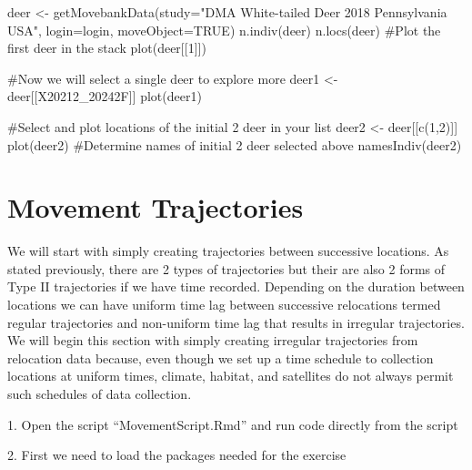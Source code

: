 \documentclass[
  letterpaper,
]{book}
\newenvironment{Shaded}{\begin{snugshade}}{\end{snugshade}}
\newcommand{\AttributeTok}[1]{\textcolor[rgb]{0.40,0.45,0.13}{#1}}
\newcommand{\CommentTok}[1]{\textcolor[rgb]{0.37,0.37,0.37}{#1}}
\newcommand{\ConstantTok}[1]{\textcolor[rgb]{0.56,0.35,0.01}{#1}}
\newcommand{\DecValTok}[1]{\textcolor[rgb]{0.68,0.00,0.00}{#1}}
\newcommand{\FunctionTok}[1]{\textcolor[rgb]{0.28,0.35,0.67}{#1}}
\newcommand{\NormalTok}[1]{\textcolor[rgb]{0.00,0.23,0.31}{#1}}
\newcommand{\OtherTok}[1]{\textcolor[rgb]{0.00,0.23,0.31}{#1}}
\newcommand{\StringTok}[1]{\textcolor[rgb]{0.13,0.47,0.30}{#1}}
\begin{document}
\begin{Shaded}
\begin{Highlighting}[]
\NormalTok{deer }\OtherTok{\textless{}{-}} \FunctionTok{getMovebankData}\NormalTok{(}\AttributeTok{study=}\StringTok{"DMA White{-}tailed Deer 2018 Pennsylvania USA"}\NormalTok{,}
                        \AttributeTok{login=}\NormalTok{login, }\AttributeTok{moveObject=}\ConstantTok{TRUE}\NormalTok{)}
\FunctionTok{n.indiv}\NormalTok{(deer)}
\FunctionTok{n.locs}\NormalTok{(deer)}
\CommentTok{\#Plot the first deer in the stack}
\FunctionTok{plot}\NormalTok{(deer[[}\DecValTok{1}\NormalTok{]])}

\CommentTok{\#Now we will select a single deer to explore more}
\NormalTok{deer1 }\OtherTok{\textless{}{-}}\NormalTok{ deer[[}\StringTok{\textquotesingle{}X20212\_20242F\textquotesingle{}}\NormalTok{]]}
\FunctionTok{plot}\NormalTok{(deer1)}

\CommentTok{\#Select and plot locations of the initial 2 deer in your list}
\NormalTok{deer2 }\OtherTok{\textless{}{-}}\NormalTok{ deer[[}\FunctionTok{c}\NormalTok{(}\DecValTok{1}\NormalTok{,}\DecValTok{2}\NormalTok{)]]}
\FunctionTok{plot}\NormalTok{(deer2)}
\CommentTok{\#Determine names of initial 2 deer selected above}
\FunctionTok{namesIndiv}\NormalTok{(deer2)}
\end{Highlighting}
\end{Shaded}

\hypertarget{movement-trajectories}{%
\chapter{Movement Trajectories}\label{movement-trajectories}}

We will start with simply creating trajectories between successive
locations. As stated previously, there are 2 types of trajectories but
their are also 2 forms of Type II trajectories if we have time recorded.
Depending on the duration between locations we can have uniform time lag
between successive relocations termed regular trajectories and
non-uniform time lag that results in irregular trajectories. We will
begin this section with simply creating irregular trajectories from
relocation data because, even though we set up a time schedule to
collection locations at uniform times, climate, habitat, and satellites
do not always permit such schedules of data collection.

1. Open the script ``MovementScript.Rmd'' and run code directly from the
script

2. First we need to load the packages needed for the exercise
\end{document}
